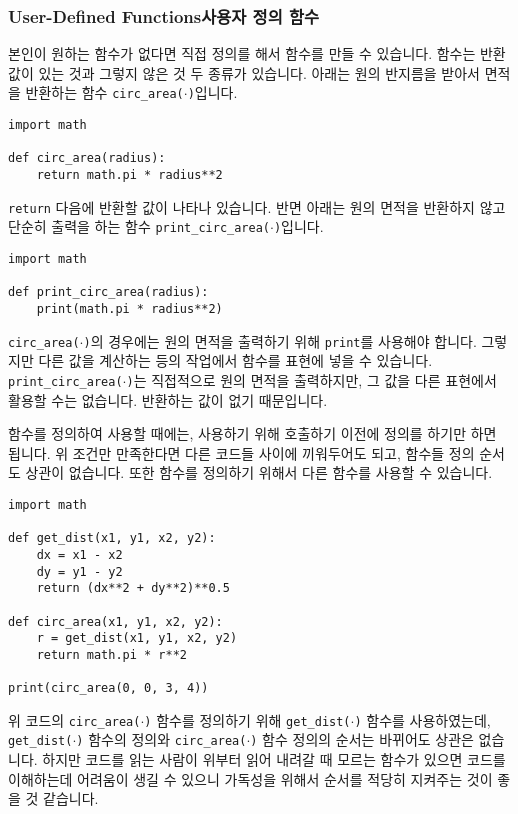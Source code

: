 \documentclass[../main.tex]{subfiles}
\begin{document}
\subsubsection{User-Defined Functions사용자 정의 함수}
본인이 원하는 함수가 없다면 직접 정의를 해서 함수를 만들 수 있습니다.
함수는 반환 값이 있는 것과 그렇지 않은 것 두 종류가 있습니다.
아래는 원의 반지름을 받아서 면적을 반환하는 함수
\texttt{circ\_area($\cdot$)}입니다.
\begin{verbatim}
import math

def circ_area(radius):
    return math.pi * radius**2
\end{verbatim}
\texttt{return} 다음에 반환할 값이 나타나 있습니다.
반면 아래는 원의 면적을 반환하지 않고 단순히 출력을 하는 함수
\texttt{print\_circ\_area($\cdot$)}입니다.
\begin{verbatim}
import math

def print_circ_area(radius):
    print(math.pi * radius**2)
\end{verbatim}
\texttt{circ\_area($\cdot$)}의 경우에는 원의 면적을 출력하기 위해
\texttt{print}를 사용해야 합니다.  그렇지만 다른 값을 계산하는 등의 작업에서
함수를 표현에 넣을 수 있습니다.  \texttt{print\_circ\_area($\cdot$)}는
직접적으로 원의 면적을 출력하지만, 그 값을 다른 표현에서 활용할 수는 없습니다.
반환하는 값이 없기 때문입니다.

함수를 정의하여 사용할 때에는, 사용하기 위해 호출하기 이전에 정의를 하기만 하면
됩니다.  위 조건만 만족한다면 다른 코드들 사이에 끼워두어도 되고, 함수들 정의
순서도 상관이 없습니다.  또한 함수를 정의하기 위해서 다른 함수를 사용할 수
있습니다.
\begin{verbatim}
import math

def get_dist(x1, y1, x2, y2):
    dx = x1 - x2
    dy = y1 - y2
    return (dx**2 + dy**2)**0.5

def circ_area(x1, y1, x2, y2):
    r = get_dist(x1, y1, x2, y2)
    return math.pi * r**2

print(circ_area(0, 0, 3, 4))
\end{verbatim}
위 코드의 \texttt{circ\_area($\cdot$)} 함수를 정의하기 위해
\texttt{get\_dist($\cdot$)} 함수를 사용하였는데, \texttt{get\_dist($\cdot$)}
함수의 정의와 \texttt{circ\_area($\cdot$)} 함수 정의의 순서는 바뀌어도 상관은
없습니다.  하지만 코드를 읽는 사람이 위부터 읽어 내려갈 때 모르는 함수가 있으면
코드를 이해하는데 어려움이 생길 수 있으니 가독성을 위해서 순서를 적당히
지켜주는 것이 좋을 것 같습니다.
\end{document}
